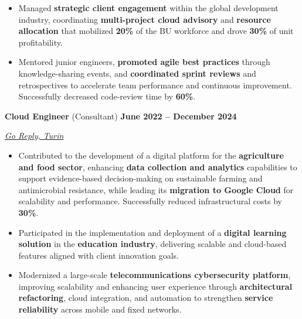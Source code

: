 \documentclass[9pt, a4paper]{article}
\newcommand{\jobsection}[3]{%
	\par {\large #1} \hfill {\bfseries #2} \par {\textit{#3}} \vspace{4pt}
}
\begin{document}
\begin{minipage}[t]{0.65\linewidth}
\begin{itemize}[leftmargin=*, nosep]
			\vspace{2pt}
			\item \footnotesize Managed \textbf{strategic client engagement} within the global development industry, coordinating \textbf{multi-project cloud advisory} and \textbf{resource allocation} that mobilized \textbf{20\%} of the BU workforce and drove \textbf{30\%} of unit profitability.
			
			\vspace{2pt}
			\item \footnotesize Mentored junior engineers, \textbf{promoted agile best practices} through knowledge-sharing events, and \textbf{coordinated sprint reviews} and retrospectives to accelerate team performance and continuous improvement. 
			Successfully decreased code-review time by \textbf{60\%}.  
		\end{itemize}
		
		\vspace{6pt}
		\jobsection{\textbf{Cloud Engineer} (Consultant)}{June 2022 -- December 2024}{\href{https://www.reply.com/go-reply/en}{Go Reply, Turin}}
		\begin{itemize}[leftmargin=*, nosep]
			
			\item \footnotesize Contributed to the development of a digital platform for the \textbf{agriculture and food sector}, enhancing \textbf{data collection and analytics} capabilities to support evidence-based decision-making on sustainable farming and antimicrobial resistance, while leading its \textbf{migration to Google Cloud} for scalability and performance. Successfully reduced infrastructural costs by \textbf{30\%}.
			
			\vspace{2pt}
			\item \footnotesize Participated in the implementation and deployment of a \textbf{digital learning solution} in the \textbf{education industry}, delivering scalable and cloud-based features aligned with client innovation goals.
			
			\vspace{2pt}
			\item \footnotesize Modernized a large-scale \textbf{telecommunications cybersecurity platform}, improving scalability and enhancing user experience through \textbf{architectural refactoring}, cloud integration, and automation to strengthen \textbf{service reliability} across mobile and fixed networks. 
		\end{itemize}
		

\end{minipage}
\end{document}
